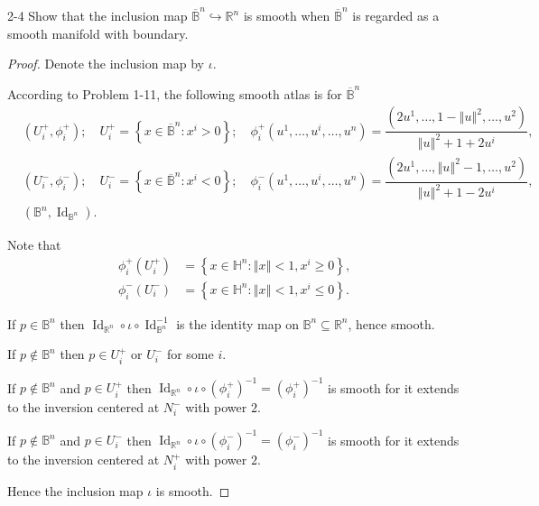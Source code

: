 \begin{problem}{2-4}
    Show that the inclusion map \( {\overline{\mathbb{B}}}^{n} \hookrightarrow \mathbb{R}^{n} \) is smooth when \( {\overline{\mathbb{B}}^{n}} \) is regarded as a smooth manifold with boundary.
\end{problem}

\begin{proof}
    Denote the inclusion map by \( \iota \).

    According to Problem 1-11, the following smooth atlas is for \( \overline{\mathbb{B}}^{n} \)
    \begingroup
    \allowdisplaybreaks%
    \begin{align*}
         & (U_{i}^{+}, \phi_{i}^{+}); \quad U_{i}^{+} = \left\{ x \in \overline{\mathbb{B}}^{n} : x^{i} > 0 \right\}; \quad \phi_{i}^{+}(u^{1}, \ldots, u^{i}, \ldots, u^{n}) = \dfrac{(2u^{1}, \ldots, 1 - {\left\Vert u \right\Vert}^{2}, \ldots, u^{2})}{{\left\Vert u \right\Vert}^{2} + 1 + 2u^{i}}, \\
         & (U_{i}^{-}, \phi_{i}^{-}); \quad U_{i}^{-} = \left\{ x \in \overline{\mathbb{B}}^{n} : x^{i} < 0 \right\}; \quad \phi_{i}^{-}(u^{1}, \ldots, u^{i}, \ldots, u^{n}) = \dfrac{(2u^{1}, \ldots, {\left\Vert u \right\Vert}^{2} - 1, \ldots, u^{2})}{{\left\Vert u \right\Vert}^{2} + 1 - 2u^{i}}, \\
         & (\mathbb{B}^{n}, \operatorname{Id}_{\mathbb{B}^{n}}).
    \end{align*}
    \endgroup

    Note that
    \begingroup
    \allowdisplaybreaks%
    \begin{align*}
        \phi_{i}^{+}(U_{i}^{+}) & = \left\{ x \in \mathbb{H}^{n} : {\left\Vert x \right\Vert} < 1, x^{i} \ge 0 \right\}, \\
        \phi_{i}^{-}(U_{i}^{-}) & = \left\{ x \in \mathbb{H}^{n} : {\left\Vert x \right\Vert} < 1, x^{i} \le 0 \right\}.
    \end{align*}
    \endgroup

    If \( p \in \mathbb{B}^{n} \) then \( \operatorname{Id}_{\mathbb{R}^{n}} \circ \iota \circ \operatorname{Id}_{\mathbb{B}^{n}}^{-1} \) is the identity map on \( \mathbb{B}^{n} \subseteq \mathbb{R}^{n} \), hence smooth.

    If \( p \notin \mathbb{B}^{n} \) then \( p \in U_{i}^{+} \) or \( U_{i}^{-} \) for some \( i \).

    If \( p \notin \mathbb{B}^{n} \) and \( p \in U_{i}^{+} \) then \( \operatorname{Id}_{\mathbb{R}^{n}} \circ \iota \circ {(\phi_{i}^{+})}^{-1} = {(\phi_{i}^{+})}^{-1} \) is smooth for it extends to the inversion centered at \( N_{i}^{-} \) with power \( 2 \).

    If \( p \notin \mathbb{B}^{n} \) and \( p \in U_{i}^{-} \) then \( \operatorname{Id}_{\mathbb{R}^{n}} \circ \iota \circ {(\phi_{i}^{-})}^{-1} = {(\phi_{i}^{-})}^{-1} \) is smooth for it extends to the inversion centered at \( N_{i}^{+} \) with power \( 2 \).

    Hence the inclusion map \( \iota \) is smooth.
\end{proof}

